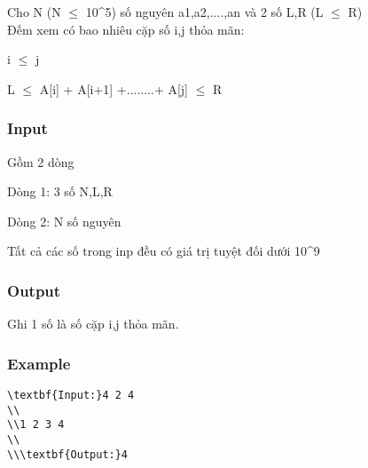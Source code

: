 



    Cho N (N $\le$ 10^5) số nguyên a1,a2,....,an và 2 số L,R (L $\le$ R)    
\\



    Đếm xem có bao nhiêu cặp số i,j thỏa mãn:   



    i  $\le$  j   



    L $\le$  A[i] + A[i+1] +........+ A[j]  $\le$ R   

\subsubsection{   Input  }

    Gồm 2 dòng   

    Dòng 1: 3 số N,L,R   

    Dòng 2: N số nguyên   

    Tất cả các số trong inp đều có giá trị tuyệt đối dưới 10^9    
\\

\subsubsection{   Output  }

    Ghi 1 số là số cặp i,j thỏa mãn.   

\subsubsection{   Example  }
\begin{verbatim}
\textbf{Input:}4 2 4
\\
\\1 2 3 4
\\
\\\textbf{Output:}4\end{verbatim}
